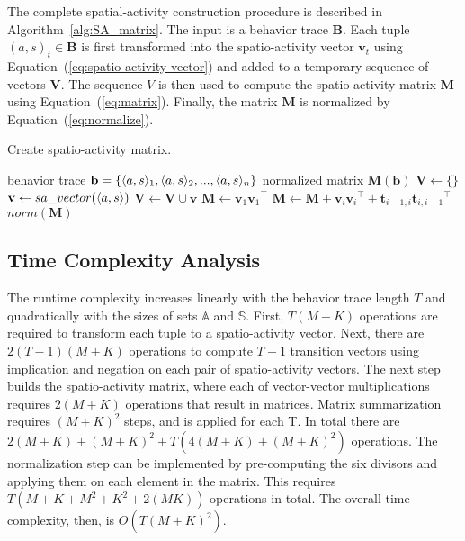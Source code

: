 The complete spatial-activity construction procedure is described in Algorithm~\ref{alg:SA_matrix}. The input is a behavior trace $\mathbf{B}$. Each tuple $(a, s)_t \in \mathbf{B}$ is first transformed into the spatio-activity vector $\mathbf{v}_t$ using Equation~(\ref{eq:spatio-activity-vector}) and added to a temporary sequence of vectors $\mathbf{V}$. The sequence $V$ is then used to compute the spatio-activity matrix $\mathbf{M}$ using Equation~(\ref{eq:matrix}). Finally, the matrix $\mathbf{M}$ is normalized by Equation~(\ref{eq:normalize}).

\begin{algorithm}
\caption{Create spatio-activity matrix.}
\label{alg:SA_matrix}
\begin{algorithmic}
\REQUIRE behavior trace $\mathbf{b}=\{\langle a,s \rangle_1,\langle a,s \rangle_2,...,\langle a,s \rangle_n\}$
\ENSURE normalized matrix $\mathbf{M}(\mathbf{b})$
\STATE $\mathbf{V}\gets \{\}$
\STATE $\mathbf{v} \gets sa\_vector({\langle a,s \rangle}) $
\STATE $\mathbf{V} \gets \mathbf{V} \cup \mathbf{v} $
\ENDFOR
\STATE $\mathbf{M} \gets \mathbf{v}_1  {\mathbf{v}_1}^\intercal$
 \STATE $\mathbf{M} \gets \mathbf{M} +  \mathbf{v}_i{\mathbf{v}_i}^\intercal + \mathbf{t}_{i-1, i}  {\mathbf{t}_{i, i-1}}^\intercal$
\ENDFOR
\STATE $norm(\mathbf{M})$
\end{algorithmic}
\end{algorithm}


\subsection{Time Complexity Analysis}

The runtime complexity increases linearly with the behavior trace length $T$ and quadratically with the sizes of sets $\mathbb{A}$ and $\mathbb{S}$. First, $T(M+K)$ operations are required to transform each tuple to a spatio-activity vector. Next, there are $2(T-1)(M+K)$ operations to compute $T-1$ transition vectors using implication and negation on each pair of spatio-activity vectors. The next step builds the spatio-activity matrix, where each of vector-vector multiplications requires $2(M+K)$ operations that result in matrices. Matrix summarization requires $(M+K)^2$ steps, and is applied for each T. In total there are $2(M+K)+(M+K)^2+T(4(M+K)+(M+K)^2)$ operations. The normalization step can be implemented by pre-computing the six divisors and applying them on each element in the matrix. This requires $T(M+K+M^2+K^2+2(MK))$ operations in total. The overall time complexity, then, is $O(T(M+K)^2)$.

